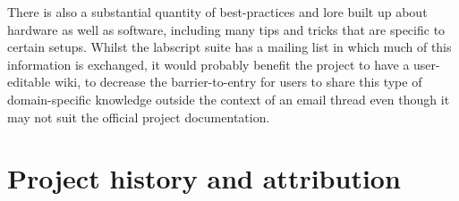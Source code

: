 There is also a substantial quantity of best-practices and lore built up about hardware as well as software, including many tips and tricks that are specific to certain setups. Whilst the labscript suite has a mailing list in which much of this information is exchanged, it would probably benefit the project to have a user-editable wiki, to decrease the barrier-to-entry for users to share this type of domain-specific knowledge outside the context of an email thread even though it may not suit the official project documentation.

\section{Project history and attribution}

\begin{figure}
    \centering
    \\

\end{figure}
